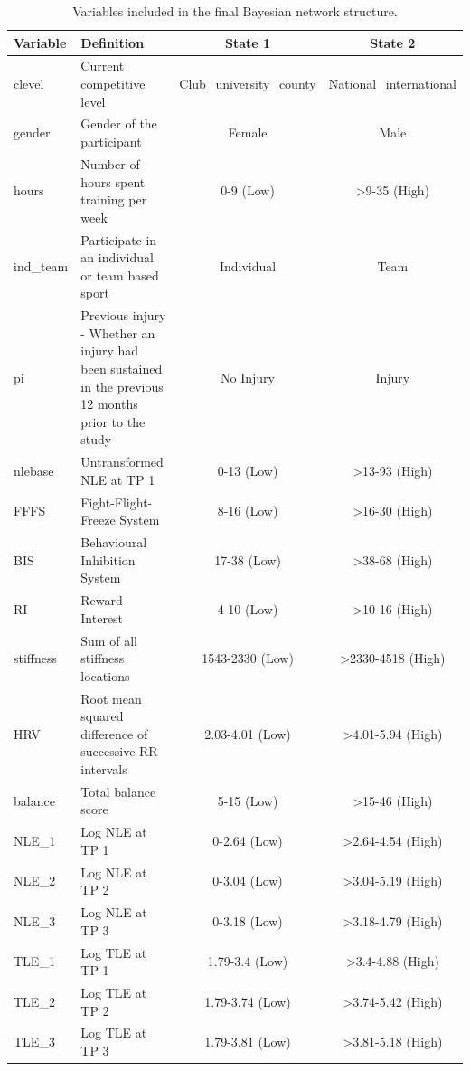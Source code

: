 \documentclass[
  english,
  man]{apa6}
\begin{document}
\begin{table}[H]

\caption{\label{tab:table2}Variables included in the final Bayesian network structure.}
\centering
\begin{tabular}[t]{l|>{\raggedright\arraybackslash}p{5.2cm}|c|c}
\hline
Variable & Definition & State 1 & State 2\\
\hline
clevel & Current competitive level & Club\_university\_county & National\_international\\
\hline
gender & Gender of the participant & Female & Male\\
\hline
hours & Number of hours spent training per week & 0-9 (Low) & >9-35 (High)\\
\hline
ind\_team & Participate in an individual or team based sport & Individual & Team\\
\hline
pi & Previous injury - Whether an injury had been sustained in the previous 12 months prior to the study & No Injury & Injury\\
\hline
nlebase & Untransformed NLE at TP 1 & 0-13 (Low) & >13-93 (High)\\
\hline
FFFS & Fight-Flight-Freeze System & 8-16 (Low) & >16-30 (High)\\
\hline
BIS & Behavioural Inhibition System & 17-38 (Low) & >38-68 (High)\\
\hline
RI & Reward Interest & 4-10 (Low) & >10-16 (High)\\
\hline
stiffness & Sum of all stiffness locations & 1543-2330 (Low) & >2330-4518 (High)\\
\hline
HRV & Root mean squared difference of successive RR intervals & 2.03-4.01 (Low) & >4.01-5.94 (High)\\
\hline
balance & Total balance score & 5-15 (Low) & >15-46 (High)\\
\hline
NLE\_1 & Log NLE at TP 1 & 0-2.64 (Low) & >2.64-4.54 (High)\\
\hline
NLE\_2 & Log NLE at TP 2 & 0-3.04 (Low) & >3.04-5.19 (High)\\
\hline
NLE\_3 & Log NLE at TP 3 & 0-3.18 (Low) & >3.18-4.79 (High)\\
\hline
TLE\_1 & Log TLE at TP 1 & 1.79-3.4 (Low) & >3.4-4.88 (High)\\
\hline
TLE\_2 & Log TLE at TP 2 & 1.79-3.74 (Low) & >3.74-5.42 (High)\\
\hline
TLE\_3 & Log TLE at TP 3 & 1.79-3.81 (Low) & >3.81-5.18 (High)\\
\hline
\end{tabular}
\end{table}
\end{document}

